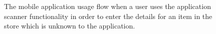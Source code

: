 \documentclass[a4paper,11pt]{report}
\begin{document}
\begin{appendix}
    \begin{figure}
        \caption{The mobile application usage flow when a user uses the application scanner functionality in order to enter the details for an item in the store which is unknown to the application.}
        \label{appendix:scenario3}
    \end{figure}



\end{appendix}
\end{document}
